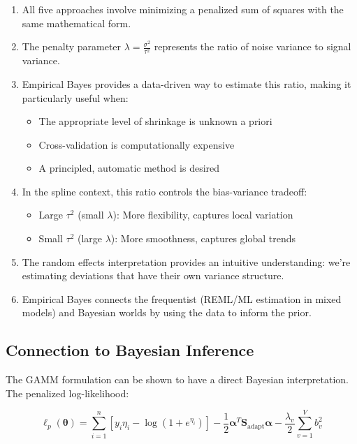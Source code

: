 \documentclass[11pt]{article}
\begin{document}
\begin{enumerate}
    \item All five approaches involve minimizing a penalized sum of squares with the same mathematical form.
    \item The penalty parameter $\lambda = \frac{\sigma^2}{\tau^2}$ represents the ratio of noise variance to signal variance.
    \item Empirical Bayes provides a data-driven way to estimate this ratio, making it particularly useful when:
    \begin{itemize}
        \item The appropriate level of shrinkage is unknown a priori
        \item Cross-validation is computationally expensive
        \item A principled, automatic method is desired
    \end{itemize}
    \item In the spline context, this ratio controls the bias-variance tradeoff:
    \begin{itemize}
        \item Large $\tau^2$ (small $\lambda$): More flexibility, captures local variation
        \item Small $\tau^2$ (large $\lambda$): More smoothness, captures global trends
    \end{itemize}
    \item The random effects interpretation provides an intuitive understanding: we're estimating deviations that have their own variance structure.
    \item Empirical Bayes connects the frequentist (REML/ML estimation in mixed models) and Bayesian worlds by using the data to inform the prior.
\end{enumerate}

\subsection*{Connection to Bayesian Inference}

The GAMM formulation can be shown to have a direct Bayesian interpretation. The penalized log-likelihood:

\begin{equation}
\ell_p(\boldsymbol{\theta}) = \sum_{i=1}^{n} \left[ y_i \eta_i - \log(1 + e^{\eta_i}) \right] - \frac{1}{2}\boldsymbol{\alpha}^T \mathbf{S}_{\text{adapt}} \boldsymbol{\alpha} - \frac{\lambda_v}{2} \sum_{v=1}^{V} b_v^2
\end{equation}
\end{document}
